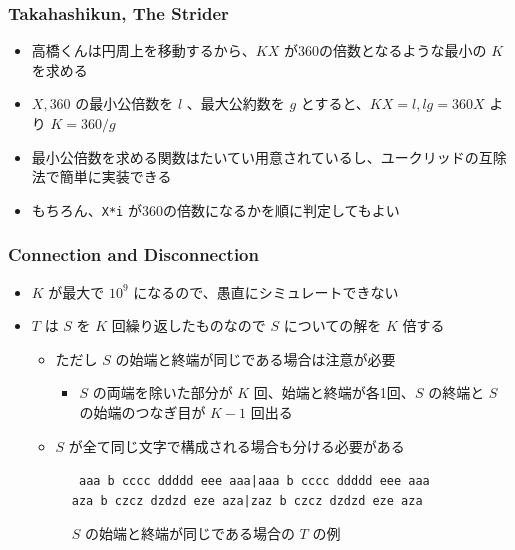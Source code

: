 \documentclass[t, aspectratio=169, dvipdfmx]{beamer}
\begin{document}
\begin{frame}[containsverbatim]
  \frametitle{Takahashikun, The Strider}
  \begin{itemize}
    \item 高橋くんは円周上を移動するから、$KX$ が360の倍数となるような最小の $K$ を求める
    \item $X,360$ の最小公倍数を $l$ 、最大公約数を $g$ とすると、$KX=l, lg=360X$ より $K=360/g$
    \item 最小公倍数を求める関数はたいてい用意されているし、ユークリッドの互除法で簡単に実装できる
    \item もちろん、\verb|X*i| が360の倍数になるかを順に判定してもよい
  \end{itemize}
\end{frame}

\begin{frame}[c]
\end{frame}

\begin{frame}[containsverbatim]
  \frametitle{Connection and Disconnection}
  \begin{itemize}
    \item $K$ が最大で $10^9$ になるので、愚直にシミュレートできない
    \item $T$ は $S$ を $K$ 回繰り返したものなので $S$ についての解を $K$ 倍する
    \begin{itemize}
      \item ただし $S$ の始端と終端が同じである場合は注意が必要
      \begin{itemize}
        \item $S$ の両端を除いた部分が $K$ 回、始端と終端が各1回、$S$ の終端と $S$ の始端のつなぎ目が $K-1$ 回出る
      \end{itemize}
      \item $S$ が全て同じ文字で構成される場合も分ける必要がある
    \end{itemize}
    \begin{figure}[b]
      \caption{$S$ の始端と終端が同じである場合の $T$ の例}
        \begin{center}\tt
          aaa b cccc ddddd eee aaa|aaa b cccc ddddd eee aaa \\
          aza b czcz dzdzd eze aza|zaz b czcz dzdzd eze aza
        \end{center}
    \end{figure}
  \end{itemize}
\end{frame}
\end{document}
